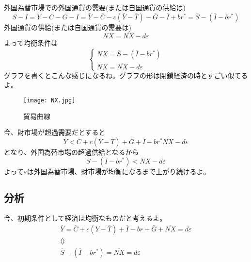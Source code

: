 \documentclass[a4paper, 12pt]{article}
\begin{document}
外国為替市場での外国通貨の需要(または自国通貨の供給は)
\begin{equation*}
  S-I=Y-C-G-I=\overline{Y}-\overline{C}-c(\overline{Y}-\overline{T})-\overline{G}-\overline{I}+br^*=\overline{S}-(\overline{I}-br^*)
\end{equation*}
外国通貨の供給(または自国通貨の需要は)
\begin{equation*}
  NX=\overline{NX}-d\varepsilon
\end{equation*}
よって均衡条件は
\begin{displaymath}
  \left\{\begin{array}{l}
    NX=\overline{S}-(\overline{I}-br^*)\\
    NX=\overline{NX}-d\varepsilon
  \end{array}\right.
\end{displaymath}
グラフを書くとこんな感じになるね。グラフの形は閉鎖経済の時とすごい似てるよ。
\begin{figure}[h]
\begin{center}
\texttt{[image: NX.jpg]}
\caption{貿易曲線}
\label{}
\end{center}
\end{figure}
今、財市場が超過需要だとすると
\begin{equation*}
  \overline{Y}<\overline{C}+c(\overline{Y}-\overline{T})+\overline{G}+\overline{I}-br^*\overline{NX}-d\varepsilon
\end{equation*}
となり、外国為替市場の超過供給となるから
\begin{equation*}
  \overline{S}-(\overline{I}-br^*)<\overline{NX}-d\varepsilon
\end{equation*}
よって$\varepsilon$は外国為替市場、財市場が均衡になるまで上がり続けるよ。
\subsection{分析}
今、初期条件として経済は均衡なものだと考えるよ。
\begin{displaymath}
  \begin{array}{c}
    \overline{Y}=\overline{C}+c(Y-\overline{T})+\overline{I}-br+\overline{G}+\overline{NX}=d\varepsilon\\
    \Updownarrow \\
    \overline{S}-(\overline{I}-br^*)=\overline{NX}=d\varepsilon
  \end{array}
\end{displaymath}
\end{document}
